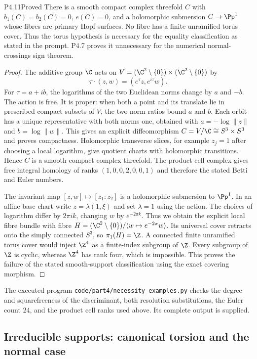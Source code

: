 \begin{statement}{P4.11}{Proved}
There is a smooth compact complex threefold $C$ with
$b_1(C)=b_2(C)=0$, $e(C)=0$, and a holomorphic submersion
$C\to\Pp^1$ whose fibres are primary Hopf surfaces. No fibre has
a finite unramified torus cover. Thus the torus hypothesis is
necessary for the equality classification as stated in the prompt.
P4.7 proves it unnecessary for the numerical normal-crossings
sign theorem.
\end{statement}
\begin{proof}
The additive group $\C$ acts on
$V=(\C^2\setminus\{0\})\times(\C^2\setminus\{0\})$ by
\[
 \tau\cdot(z,w)=(e^\tau z,e^{i\tau}w).
\]
For $\tau=a+ib$, the logarithms of the two Euclidean norms change
by $a$ and $-b$. The action is free. It is proper: when both a
point and its translate lie in prescribed compact subsets of $V$,
the two norm ratios bound $a$ and $b$. Each orbit has a unique
representative with both norms one, obtained with
$a=-\log\|z\|$ and $b=\log\|w\|$. This gives an explicit
diffeomorphism $C=V/\C\cong S^3\times S^3$ and proves compactness.
Holomorphic transverse slices, for example $z_j=1$ after choosing
a local logarithm, give quotient charts with holomorphic
transitions. Hence $C$ is a smooth compact complex threefold.
The product cell complex gives free integral homology of ranks
$(1,0,0,2,0,0,1)$ and therefore the stated Betti and Euler numbers.

The invariant map $[z,w]\mapsto[z_1:z_2]$ is a holomorphic
submersion to $\Pp^1$. In an affine base chart write
$z=\lambda(1,\xi)$ and set $\lambda=1$ using the action.
The choices of logarithm differ by $2\pi ik$, changing $w$ by
$e^{-2\pi k}$. Thus we obtain the explicit local fibre bundle
with fibre
$H=(\C^2\setminus\{0\})/\langle w\mapsto e^{-2\pi}w\rangle$.
Its universal cover retracts onto the simply connected $S^3$, so
$\pi_1(H)=\Z$. A connected finite unramified torus cover would
inject $\Z^4$ as a finite-index subgroup of $\Z$. Every subgroup
of $\Z$ is cyclic, whereas $\Z^4$ has rank four, which is
impossible. This proves the failure of the stated smooth-support
classification using the exact covering morphism.
\end{proof}

The executed program \texttt{code/part4/necessity\_examples.py}
checks the degree and squarefreeness of the discriminant, both
resolution substitutions, the Euler count $24$, and the product
cell ranks used above. Its complete output is supplied.

\subsection{Irreducible supports: canonical torsion and the normal case}

